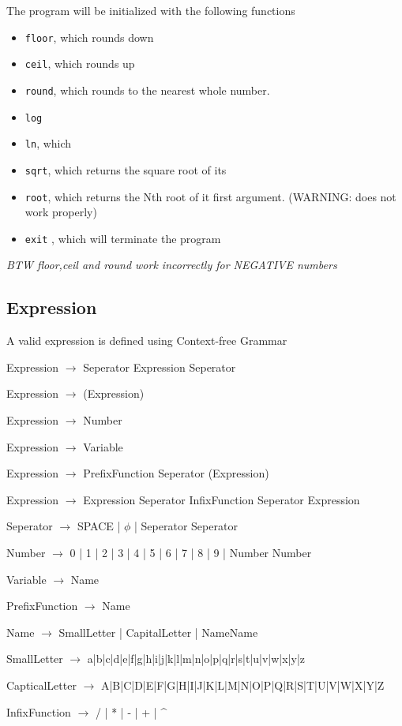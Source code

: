 \documentclass[11pt,a4paper]{article}
\begin{document}
The program will be initialized with the following functions
\begin{itemize}
\item \texttt{floor}, which rounds down
\item \texttt{ceil}, which rounds up
\item \texttt{round}, which rounds to the nearest  whole number.
\item \texttt{log}
\item \texttt{ln}, which
\item \texttt{sqrt}, which returns the square root of its
\item \texttt{root}, which returns the Nth root of it first argument.  (WARNING: does not work properly)
\item \texttt{exit} , which will terminate the program
\end{itemize}


\emph{BTW floor,ceil and round work incorrectly for NEGATIVE numbers}
\subsection{Expression}
A valid expression is defined using Context-free Grammar

Expression \(\rightarrow\) Seperator Expression Seperator

Expression \(\rightarrow\) (Expression)

Expression \(\rightarrow\) Number

Expression \(\rightarrow\) Variable

Expression \(\rightarrow\) PrefixFunction Seperator (Expression)

Expression \(\rightarrow\) Expression Seperator InfixFunction Seperator Expression

Seperator \(\rightarrow\) SPACE | \(\phi\) | Seperator Seperator

Number \(\rightarrow\) 0 | 1 | 2 | 3 | 4 | 5 | 6 | 7 | 8 | 9 | Number Number

Variable \(\rightarrow\) Name

PrefixFunction \(\rightarrow\) Name

Name \(\rightarrow\) SmallLetter | CapitalLetter | NameName

SmallLetter \(\rightarrow\) a|b|c|d|e|f|g|h|i|j|k|l|m|n|o|p|q|r|s|t|u|v|w|x|y|z

CapticalLetter \(\rightarrow\) A|B|C|D|E|F|G|H|I|J|K|L|M|N|O|P|Q|R|S|T|U|V|W|X|Y|Z

InfixFunction \(\rightarrow\) / | * | - | + | \^{}
\end{document}
